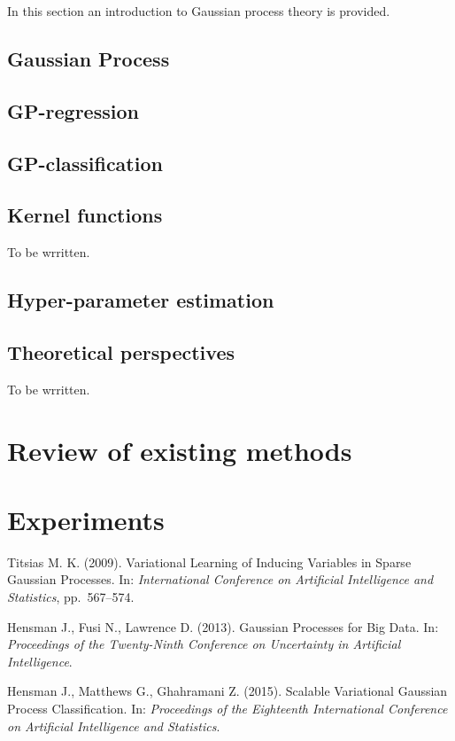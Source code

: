 \documentclass[12pt]{article}
\begin{document}
In this section an introduction to Gaussian process theory is provided.

\subsection{Gaussian Process}
	
	
\subsection{GP-regression}
	
		
\subsection{GP-classification}
	
	
\subsection{Kernel functions}
	To be wrritten.
	
\subsection{Hyper-parameter estimation}
	
	
\subsection{Theoretical perspectives}
	\hspace{0.6cm}To be wrritten.

\pagebreak
\section{Review of existing methods}
	
	\pagebreak

\section{Experiments}
	

\pagebreak
\begin{thebibliography}{99}

Titsias M. K. (2009).  Variational Learning of Inducing Variables in Sparse Gaussian
Processes.  In: {\it International Conference on Artificial Intelligence and Statistics}, pp.~567–574.

Hensman J., Fusi N., Lawrence D. (2013).  Gaussian Processes for Big Data.  In: {\it Proceedings of the Twenty-Ninth Conference on Uncertainty in Artificial Intelligence}.

Hensman J., Matthews G., Ghahramani Z. (2015). Scalable Variational Gaussian Process Classification.  In: {\it Proceedings of the Eighteenth International Conference on Artificial Intelligence and Statistics}.

\end{thebibliography}	
\end{document}
